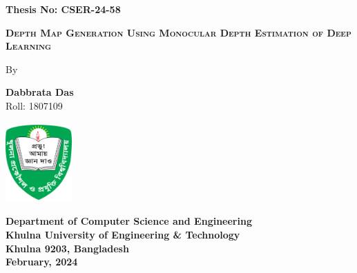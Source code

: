 \documentclass[a4paper,12pt,oneside]{book}
\begin{document}
\frontmatter

\begin{titlepage}
    \centering
    \begin{flushleft}
        \textbf{\fontsize{14}{21}\selectfont Thesis No: CSER-24-58}
    \end{flushleft}
    \vspace{0pt}
    
    \textsc{\textbf{\fontsize{18}{27}\selectfont Depth Map Generation Using Monocular Depth Estimation of Deep Learning\\}}
    
    \vspace{36pt}
    
    {\fontsize{14}{21}\selectfont By\\}
    \vspace{54pt}
    
    \textbf{\fontsize{14}{21}\selectfont Dabbrata Das\\}
    {\fontsize{14}{21}\selectfont Roll: 1807109\\}

    \vspace{78pt}

    \includegraphics[width=1in,height=1.2in]{Figures/logo.png}\\

    \vspace{104pt}
    
    \textbf{\fontsize{12}{18}\selectfont Department of Computer Science and Engineering\\
    Khulna University of Engineering \& Technology\\
    Khulna 9203, Bangladesh\\
    February, 2024\\
    }
        
\end{titlepage}
\newpage
\end{document}
